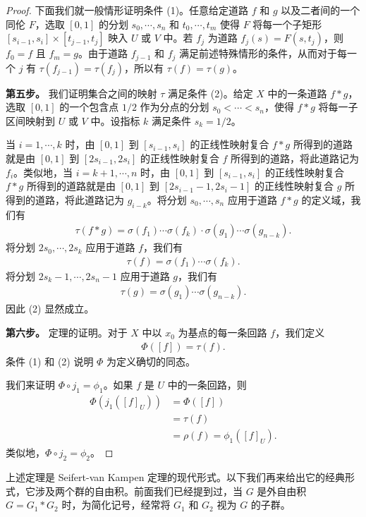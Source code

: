 \documentclass[../../main.tex]{subfiles}
\begin{document}
\begin{proof}
下面我们就一般情形证明条件 (1)。任意给定道路 $f$ 和 $g$ 以及二者间的一个同伦 $F$，选取 $[0,1]$ 的分划 $s_0,\cdots,s_n$ 和 $t_0,\cdots,t_m$ 使得 $F$ 将每一个子矩形 $[s_{i-1},s_i]\times[t_{j-1},t_j]$ 映入 $U$ 或 $V$ 中。若 $f_j$ 为道路 $f_j(s)=F(s,t_j)$，则 $f_0=f$ 且 $f_m=g$。由于道路 $f_{j-1}$ 和 $f_j$ 满足前述特殊情形的条件，从而对于每一个 $j$ 有 $\tau(f_{j-1})=\tau(f_j)$，所以有 $\tau(f)=\tau(g)$。

\textbf{第五步。} 我们证明集合之间的映射 $\tau$ 满足条件 (2)。给定 $X$ 中的一条道路 $f*g$，选取 $[0,1]$ 的一个包含点 $1/2$ 作为分点的分划 $s_0<\cdots<s_n$，使得 $f*g$ 将每一子区间映射到 $U$ 或 $V$ 中。设指标 $k$ 满足条件 $s_k=1/2$。

当 $i=1,\cdots,k$ 时，由 $[0,1]$ 到 $[s_{i-1},s_i]$ 的正线性映射复合 $f*g$ 所得到的道路就是由 $[0,1]$ 到 $[2s_{i-1},2s_i]$ 的正线性映射复合 $f$ 所得到的道路，将此道路记为 $f_i$。类似地，当 $i=k+1,\cdots,n$ 时，由 $[0,1]$ 到 $[s_{i-1},s_i]$ 的正线性映射复合 $f*g$ 所得到的道路就是由 $[0,1]$ 到 $[2s_{i-1}-1,2s_i-1]$ 的正线性映射复合 $g$ 所得到的道路，将此道路记为 $g_{i-k}$。将分划 $s_0,\cdots,s_n$ 应用于道路 $f*g$ 的定义域，我们有
\begin{align*}
\tau(f*g)=\sigma(f_1)\cdots\sigma(f_k)\cdot\sigma(g_1)\cdots\sigma(g_{n-k}).
\end{align*}
将分划 $2s_0,\cdots,2s_k$ 应用于道路 $f$，我们有
\begin{align*}
\tau(f)=\sigma(f_1)\cdots\sigma(f_k).
\end{align*}
将分划 $2s_k-1,\cdots,2s_n-1$ 应用于道路 $g$，我们有
\begin{align*}
\tau(g)=\sigma(g_1)\cdots\sigma(g_{n-k}).
\end{align*}
因此 (2) 显然成立。

\textbf{第六步。} 定理的证明。对于 $X$ 中以 $x_0$ 为基点的每一条回路 $f$，我们定义
\begin{align*}
\Phi([f])=\tau(f).
\end{align*}
条件 (1) 和 (2) 说明 $\Phi$ 为定义确切的同态。

我们来证明 $\Phi\circ j_1=\phi_1$。如果 $f$ 是 $U$ 中的一条回路，则
\begin{align*}
\Phi(j_1([f]_U))&=\Phi([f])\\
&=\tau(f)\\
&=\rho(f)=\phi_1([f]_U).
\end{align*}
类似地，$\Phi\circ j_2=\phi_2$。
\end{proof}

上述定理是 Seifert-van Kampen 定理的现代形式。以下我们再来给出它的经典形式，它涉及两个群的自由积。前面我们已经提到过，当 $G$ 是外自由积 $G=G_1*G_2$ 时，为简化记号，经常将 $G_1$ 和 $G_2$ 视为 $G$ 的子群。
\end{document}
